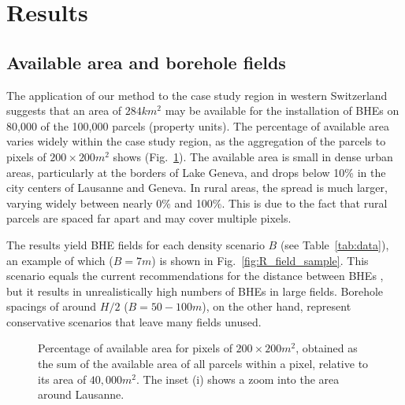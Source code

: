\section{Results}
\label{results}

\subsection{Available area and borehole fields}

The application of our method to the case study region in western Switzerland suggests that an area of $284 km^2$ may be available for the installation of BHEs on 80,000 of the 100,000 parcels (property units).
The percentage of available area varies widely within the case study region, as the aggregation of the parcels to pixels of $200 \times 200 m^2$ shows (Fig.~\ref{fig:avail_area}).
The available area is small in dense urban areas, particularly at the borders of Lake Geneva, and drops below 10\% in the city centers of Lausanne and Geneva. 
In rural areas, the spread is much larger, varying widely between nearly 0\% and 100\%. 
This is due to the fact that rural parcels are spaced far apart and may cover multiple pixels. 

The results yield BHE fields for each density scenario $B$ (see Table~\ref{tab:data}), an example of which ($B = 7m$) is shown in Fig.~\ref{fig:R_field_sample}.
This scenario equals the current recommendations for the distance between BHEs \cite{miglani_methodology_2018}, but it results in unrealistically high numbers of BHEs in large fields. 
Borehole spacings of around $H/2$ ($B=50-100m$), on the other hand, represent conservative scenarios that leave many fields unused. 

\begin{figure}[tb]
\centering
{}
\caption{Percentage of available area for pixels of $200 \times 200m^2$, obtained as the sum of the available area of all parcels within a pixel, relative to its area of $40,000 m^2$. The inset (i) shows a zoom into the area around Lausanne.}
\label{fig:avail_area}
\end{figure}


